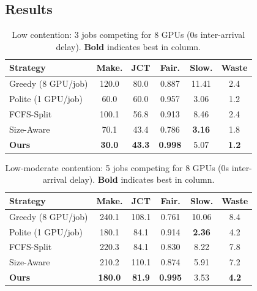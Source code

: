 \documentclass[letterpaper,10pt]{article}
\begin{document}
\subsection{Results}


\begin{table}[ht]
\centering
\caption{Low contention: 3 jobs competing for 8 GPUs (0s inter-arrival delay). \textbf{Bold} indicates best in column.}
\label{tab:results_3jobs}
\footnotesize
\setlength{\tabcolsep}{3pt}
\begin{tabular}{lccccc}
\toprule
Strategy & Make. & JCT & Fair. & Slow. & Waste \\
\midrule
Greedy (8 GPU/job) & 120.0 & 80.0 & 0.887 & 11.41 & 2.4 \\
Polite (1 GPU/job) & 60.0 & 60.0 & 0.957 & 3.06 & 1.2 \\
FCFS-Split & 100.1 & 56.8 & 0.913 & 8.46 & 2.4 \\
Size-Aware & 70.1 & 43.4 & 0.786 & \textbf{3.16} & 1.8 \\
\textbf{Ours} & \textbf{30.0} & \textbf{43.3} & \textbf{0.998} & 5.07 & \textbf{1.2} \\
\bottomrule
\end{tabular}
\end{table}

\begin{table}[ht]
\centering
\caption{Low-moderate contention: 5 jobs competing for 8 GPUs (0s inter-arrival delay). \textbf{Bold} indicates best in column.}
\label{tab:results_5jobs}
\footnotesize
\setlength{\tabcolsep}{3pt}
\begin{tabular}{lccccc}
\toprule
Strategy & Make. & JCT & Fair. & Slow. & Waste \\
\midrule
Greedy (8 GPU/job) & 240.1 & 108.1 & 0.761 & 10.06 & 8.4 \\
Polite (1 GPU/job) & 180.1 & 84.1 & 0.914 & \textbf{2.36} & 4.2 \\
FCFS-Split & 220.3 & 84.1 & 0.830 & 8.22 & 7.8 \\
Size-Aware & 210.2 & 110.1 & 0.874 & 5.91 & 7.2 \\
\textbf{Ours} & \textbf{180.0} & \textbf{81.9} & \textbf{0.995} & 3.53 & \textbf{4.2} \\
\bottomrule
\end{tabular}
\end{table}
\end{document}
